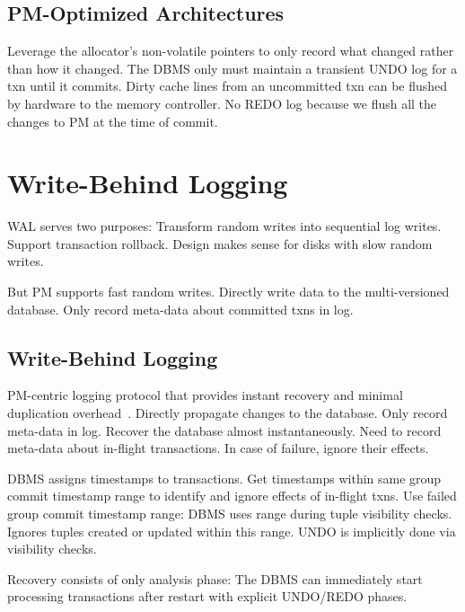 \documentclass[11pt]{article}
\begin{document}
\subsection*{PM-Optimized Architectures}
Leverage the allocator’s non-volatile pointers to only record what changed rather than how it changed. The DBMS only must maintain a transient UNDO log for a txn until it commits. Dirty cache lines from an uncommitted txn can be flushed by hardware to the memory controller. No REDO log because we flush all the changes to PM at the time of commit. 


\section{Write-Behind Logging}
WAL serves two purposes: Transform random writes into sequential log writes. Support transaction rollback. Design makes sense for disks with slow random writes. 

But PM supports fast random writes. Directly write data to the multi-versioned database. Only record meta-data about committed txns in log.

\subsection*{Write-Behind Logging}
PM-centric logging protocol that provides instant recovery and minimal duplication overhead~\cite{Arulraj2016}. Directly propagate changes to the database. Only record meta-data in log. Recover the database almost instantaneously. Need to record meta-data about in-flight transactions. In case of failure, ignore their effects.

DBMS assigns timestamps to transactions. Get timestamps within same group commit timestamp range to identify and ignore effects of in-flight txns. Use failed group commit timestamp range: DBMS uses range during tuple visibility checks. Ignores tuples created or updated within this range. UNDO is implicitly done via visibility checks.

Recovery consists of only analysis phase: The DBMS can immediately start processing transactions after restart with explicit UNDO/REDO phases.
\end{document}
